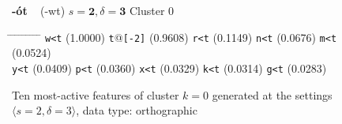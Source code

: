 \begin{figure}[t] 
\begin{mdframed}
{\LARGE \textbf{-\'{o}t}} {\large\,\,\, (-wt)} \hfill \large{$s=\textbf{2}, \delta=\textbf{3}$} \hfill Cluster 0\\
\vspace{-10pt}
\vspace{3pt}
\begin{small}
\begin{tabbing}
\hspace{6ex} \= \hspace{9.5ex} \= \hspace{6ex} \= \hspace{9.5ex} \= \hspace{6ex} \= \hspace{9.5ex} \= \hspace{6ex} \= \hspace{9.5ex} \= \hspace{5ex} \= \hspace{9ex} \kill
\texttt{w<t} \> (1.0000) \> \texttt{t}@\texttt{[-2]} \> (0.9608) \> \texttt{r<t} \> (0.1149) \> \texttt{n<t} \> (0.0676) \> \texttt{m<t} \> (0.0524) \\
\texttt{y<t} \> (0.0409) \> \texttt{p<t} \> (0.0360) \> \texttt{x<t} \> (0.0329) \> \texttt{k<t} \> (0.0314) \> \texttt{g<t} \> (0.0283)
\end{tabbing}
\caption{Ten most-active features of cluster $k = 0$ generated at the settings $\langle{s}=2,\delta=3\rangle$, data type: orthographic}
\label{fig:cluster-0-2-3-O}
\end{small}
\end{mdframed}
\end{figure}

